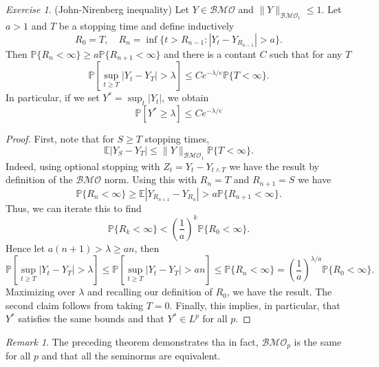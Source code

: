 \documentclass[11pt]{article}
\theoremstyle{remark}
\newtheorem{exr}{Exercise}
\newtheorem*{rmk}{Remark}
\newcommand{\1}{\textbf{1}}
\def\norm#1{\| #1  \|}
\newcommand{\bbP}{\mathbb{P}}
\newcommand{\bbE}{\mathbb{E}}
\begin{document}
\begin{exr}(John-Nirenberg inequality) Let $Y \in \mathcal{BMO}$ and $\norm{Y}_{\mathcal{BMO}_1} \leq 1$. Let $a > 1$ and $T$ be a stopping time and define inductively
\[
R_0 = T, \quad R_n = \inf\{t > R_{n-1} : |Y_t - Y_{R_{n-1}}| > a\}.
\]
Then $\bbP\{R_n < \infty\} \geq a \bbP\{R_{n+1} < \infty\}$ and there is a contant $C$ such that for any $T$
\[
\bbP \left[ \sup_{t \geq T} |Y_t - Y_T| > \lambda \right] \leq C e^{-\lambda/e} \bbP\{T < \infty\}.
\]
In particular, if we set $Y^* = \sup_t|Y_t|$, we obtain
\[
\bbP[Y^* \geq \lambda] \leq C e^{-\lambda /e}
\]
\begin{proof}
First, note that for $S \geq T$ stopping times,
\[
\bbE|Y_S - Y_T| \leq \norm{Y}_{\mathcal{BMO}_1} \bbP\{T < \infty\}.
\]
Indeed, using optional stopping with $Z_t = Y_t - Y_{t \wedge T}$ we have the result by definition of the $\mathcal{BMO}$ norm. Using this with $R_{n} = T$ and $R_{n+1} = S$ we have
\[
\bbP\{R_{n} < \infty\} \geq \bbE|Y_{R_{n+1}} - Y_{R_{n}}| > a \bbP \{R_{n+1} < \infty\}.
\]
Thus, we can iterate this to find
\[
\bbP \{R_k < \infty\} < \left(\frac{1}{a}\right)^k \bbP \{R_{0} < \infty\}.
\]
Hence let $a(n+1) > \lambda \geq an$, then
\[
\bbP \left[ \sup_{t \geq T} |Y_t - Y_T| > \lambda \right] \leq \bbP \left[ \sup_{t \geq T} |Y_t - Y_T| > an \right] \leq \bbP \{R_{n} < \infty\} = \left(\frac{1}{a}\right)^{\lambda/a} \bbP \{R_{0} < \infty\}.
\]
Maximizing over $\lambda$ and recalling our definition of $R_0$, we have the result. The second claim follows from taking $T = 0$. Finally, this implies, in particular, that $Y^*$ satisfies the same bounds and that $Y^* \in L^p$ for all $p$.
\end{proof}
\end{exr}
\begin{rmk}
The preceding theorem demonstrates tha in fact, $\mathcal{BMO}_p$ is the same for all $p$ and that all the seminorms are equivalent.
\end{rmk}
\end{document}
